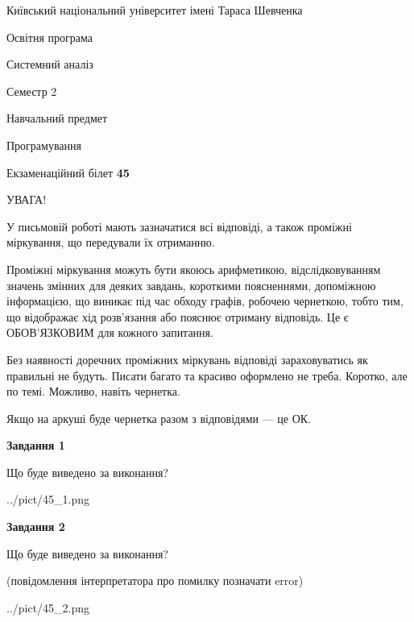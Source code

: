 \documentclass[12pt, ukrainian]{article}
\begin{document}
{{\begin {small}\par
{ \center  Київський національний університет імені Тараса Шевченка \par}
{\parbox {5 cm}{Освітня програма \hfill}{\parbox {7 cm}{Системний аналіз \hfill}}\parbox {6 cm}{\hfill Семестр 2}}\par
{\parbox {5 cm} {Навчальний предмет \hfill}\parbox {7 cm}{Програмування \hfill}\parbox {6cm}{\hfill}\par}\vspace{-7pt} \end{small}}{\center Екзаменаційний білет \No \textbf
{ 45 }\par}}
{
\begin {large}
УВАГА!

У письмовій роботі мають зазначатися всі відповіді, а також проміжні міркування, що передували їх отриманню.

Проміжні міркування можуть бути якоюсь арифметикою, відслідковуванням зна\-чень змінних для деяких завдань,
короткими поясненнями, допоміжною інформацією, що виникає під час обходу графів, робочею чернеткою,
тобто тим, що відображає хід розв’язання або пояснює отриману відповідь.
Це є ОБОВ’ЯЗКОВИМ для кожного запитання.

Без наявності доречних проміжних міркувань відповіді зараховуватись як правиль\-ні не будуть.
Писати багато та красиво оформлено не треба. Коротко, але по темі. Можли\-во, навіть чернетка.

Якщо на аркуші буде чернетка разом з відповідями --- це ОК.

\newpage

{\begin {center}\textbf{Завдання 1}\end {center}}\par
Що буде виведено за виконання?\par
\begin{center}
	{../pict/45_1.png}
\end{center}
\newpage

{\begin {center}\textbf{Завдання 2}\end {center}}\par
Що буде виведено за виконання?\par
 (повідомлення інтерпретатора про помилку позначати error)\par
\begin{center}
	{../pict/45_2.png}
\end{center}
\newpage


\end{large}}
\end{document}
